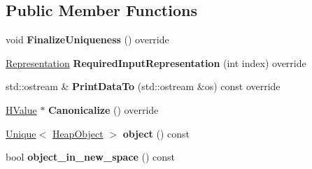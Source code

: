 \subsection*{Public Member Functions}
\begin{DoxyCompactItemize}
\item 
void {\bfseries Finalize\+Uniqueness} () override\hypertarget{classv8_1_1internal_1_1_h_check_value_ad98ebeacf5b4387c0c91c20aadfc3468}{}\label{classv8_1_1internal_1_1_h_check_value_ad98ebeacf5b4387c0c91c20aadfc3468}

\item 
\hyperlink{classv8_1_1internal_1_1_representation}{Representation} {\bfseries Required\+Input\+Representation} (int index) override\hypertarget{classv8_1_1internal_1_1_h_check_value_af9b60413d79b78297c959e36055f3786}{}\label{classv8_1_1internal_1_1_h_check_value_af9b60413d79b78297c959e36055f3786}

\item 
std\+::ostream \& {\bfseries Print\+Data\+To} (std\+::ostream \&os) const  override\hypertarget{classv8_1_1internal_1_1_h_check_value_a2c1c0537b48c2a08663bb0dfc9eb6fa1}{}\label{classv8_1_1internal_1_1_h_check_value_a2c1c0537b48c2a08663bb0dfc9eb6fa1}

\item 
\hyperlink{classv8_1_1internal_1_1_h_value}{H\+Value} $\ast$ {\bfseries Canonicalize} () override\hypertarget{classv8_1_1internal_1_1_h_check_value_a74086ae2ae44036437bfe48ad864cebb}{}\label{classv8_1_1internal_1_1_h_check_value_a74086ae2ae44036437bfe48ad864cebb}

\item 
\hyperlink{classv8_1_1internal_1_1_unique}{Unique}$<$ \hyperlink{classv8_1_1internal_1_1_heap_object}{Heap\+Object} $>$ {\bfseries object} () const \hypertarget{classv8_1_1internal_1_1_h_check_value_a9a427bb18a1866426099318455112896}{}\label{classv8_1_1internal_1_1_h_check_value_a9a427bb18a1866426099318455112896}

\item 
bool {\bfseries object\+\_\+in\+\_\+new\+\_\+space} () const \hypertarget{classv8_1_1internal_1_1_h_check_value_ad6ed5218b0711b6c607909dabe3a2a20}{}\label{classv8_1_1internal_1_1_h_check_value_ad6ed5218b0711b6c607909dabe3a2a20}

\end{DoxyCompactItemize}
